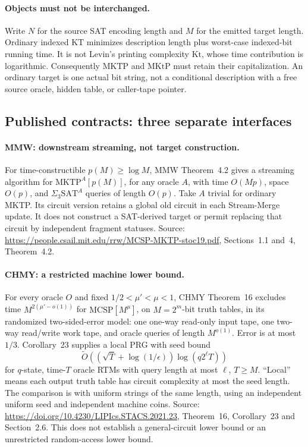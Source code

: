 \documentclass[11pt]{article}
\begin{document}
\paragraph{Objects must not be interchanged.}
Write $N$ for the source SAT encoding length and $M$ for the emitted target
length. Ordinary indexed $\mathrm{KT}$ minimizes description length plus
worst-case indexed-bit running time. It is not Levin's printing complexity
$\mathrm{Kt}$, whose time contribution is logarithmic. Consequently
$\mathrm{MKTP}$ and $\mathrm{MKtP}$ must retain their capitalization.
An ordinary target is one actual bit string, not a conditional description
with a free source oracle, hidden table, or caller-tape pointer.

\subsection{Published contracts: three separate interfaces}

\paragraph{MMW: downstream streaming, not target construction.}
For time-constructible $p(M)\geq\log M$, MMW Theorem~4.2 gives a streaming
algorithm for $\mathrm{MKTP}^{A}[p(M)]$, for any oracle $A$, with time
$O(Mp)$, space $O(p)$, and $\Sigma_3\mathrm{SAT}^{A}$ queries of length
$O(p)$. Take $A$ trivial for ordinary MKTP. Its circuit version retains a
global old circuit in each Stream-Merge update. It does not construct a
SAT-derived target or permit replacing that circuit by independent fragment
statuses. Source: \url{https://people.csail.mit.edu/rrw/MCSP-MKTP-stoc19.pdf},
Sections~1.1 and~4, Theorem~4.2.

\paragraph{CHMY: a restricted machine lower bound.}
For every oracle $O$ and fixed $1/2<\mu'<\mu<1$, CHMY Theorem~16 excludes
time $M^{2(\mu'-o(1))}$ for $\mathrm{MCSP}[M^\mu]$, on $M=2^m$-bit truth
tables, in its randomized two-sided-error model: one one-way read-only
input tape, one two-way read/write work tape, and oracle queries of length
$M^{o(1)}$. Error is at most $1/3$. Corollary~23 supplies a local PRG with
seed bound
\[
 \widetilde O\!\left((\sqrt T+\log(1/\epsilon))
                    \log(q2^\ell T)\right)
\]
for $q$-state, time-$T$ oracle RTMs with query length at most $\ell$,
$T\geq M$. ``Local'' means each output truth table has circuit complexity
at most the seed length. The comparison is with uniform strings of the
same length, using an independent uniform seed and independent machine
coins. Source:
\url{https://doi.org/10.4230/LIPIcs.STACS.2021.23}, Theorem~16,
Corollary~23 and Section~2.6. This does not establish a general-circuit
lower bound or an unrestricted random-access lower bound.
\end{document}
